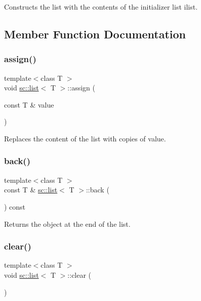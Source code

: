 Constructs the list with the contents of the initializer list ilist. 



\subsection{Member Function Documentation}
\mbox{\label{classsc_1_1list_a78a44a732aedc5c4aa42f5437dec0100}} 
\subsubsection{\texorpdfstring{assign()}{assign()}}
{\footnotesize\ttfamily template$<$class T $>$ \\
void \mbox{\hyperlink{classsc_1_1list}{sc\+::list}}$<$ T $>$\+::assign (\begin{DoxyParamCaption}\item[{const T \&}]{value }\end{DoxyParamCaption})}



Replaces the content of the list with copies of {\ttfamily value}. 

\mbox{\label{classsc_1_1list_a03ed3eccb9d7cff1d695c13d496dd26c}} 
\subsubsection{\texorpdfstring{back()}{back()}}
{\footnotesize\ttfamily template$<$class T $>$ \\
const T \& \mbox{\hyperlink{classsc_1_1list}{sc\+::list}}$<$ T $>$\+::back (\begin{DoxyParamCaption}{ }\end{DoxyParamCaption}) const}



Returns the object at the end of the list. 

\mbox{\label{classsc_1_1list_aece86319a40d15b88fd1a981ba1a226e}} 
\subsubsection{\texorpdfstring{clear()}{clear()}}
{\footnotesize\ttfamily template$<$class T $>$ \\
void \mbox{\hyperlink{classsc_1_1list}{sc\+::list}}$<$ T $>$\+::clear (\begin{DoxyParamCaption}{ }\end{DoxyParamCaption})}



